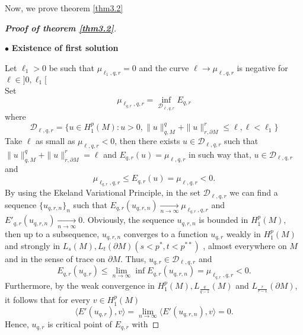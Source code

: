 \documentclass{Tran-l}
\theoremstyle{definition}
\theoremstyle{remark}
\numberwithin{equation}{section}
\begin{document}
Now, we prove theorem \ref{thm3.2}
\begin{proof}[\textbf{Proof of theorem \ref{thm3.2}}]
\begin{quote}
\end{quote}
\begin{flushleft}
$\bullet$ \textbf{Existence of first solution}
\end{flushleft}Let $\ell_1>0$ be such that $\mu_{\ell_1,q,r}=0$ and the curve
$\ell\rightarrow\mu_{\ell,q,r}$ is negative for
$\ell\in]0,\ell_1[ $ \\
Set
\begin{equation*}
\mu_{\ell_{q,r},q,r}=\inf_{{\mathcal{D}}_{\ell,q,r}}E_{q,r}
\end{equation*}
where
\begin{equation*}
{\mathcal{D}}_{\ell,q,r}=\{u\in H^p_1(M): u>0, \|u\|_{q,M}^q+\|u\|_{r,\partial
M}^r\leq\ell,\ell<\ell_1\}
\end{equation*}
Take $\ell$ as small as $\mu_{\ell,q,r}<0$, then there exists $u\in
{\mathcal{D}}_{\ell,q,r}$ such that $\|u\|_{q,M}^q+\|u\|_{r,\partial M}^r=\ell$
and $ E_{q,r}(u)=\mu_{\ell,q,r}$ in such way that,
$u\in{\mathcal{D}}_{\ell,q,r}$ and
\begin{equation}\label{eq5.2}
\mu_{\ell_{q,r},q,r}\leq E_{q,r}(u)=\mu_{\ell,q,r}<0.
\end{equation}
By using the Ekeland Variational Principle, in the set
${\mathcal{D}}_{\ell,q,r}$ we can find a sequence $\{u_{q,r,n}\}_n$ such that
$E_{q,r}(u_{q,r,n})\underset{
n\rightarrow\infty}\rightarrow\mu_{\ell_{q,r},q,r}$ and
$E'_{q,r}(u_{q,r,n})\underset{ n\rightarrow\infty}\rightarrow0$.
Obviously, the sequence $u_{q,r,n}$ is bounded in $H^p_1(M)$, then
up to a subsequence, $u_{q,r,n}$ converges to a function $u_{q,r}$
weakly in $H^p_1(M)$ and strongly in $L_s(M), L_t(\partial
M)(s<p^*,t<p^{**})$ , almost everywhere on $M$ and in the sense of
trace on $\partial M$. Thus, $u_{q,r}\in{\mathcal{D}}_{\ell,q,r}$ and
\begin{equation*}
 E_{q,r}(u_{q,r})\le\lim_{n\rightarrow\infty}\inf
E_{q,r}(u_{q,r,n})=\mu_{\ell_{q,r},q,r}<0.
\end{equation*}
Furthermore, by the weak convergence in $H^p_1(M),
L_{\frac{q}{q-1}}(M)$ and $L_{\frac{r}{r-1}}(\partial M)$, it
follows that for every $v\in H^p_1(M)$
\begin{equation*}
\langle E'(u_{q,r}),v\rangle=\lim_{n\rightarrow\infty}\langle
E'(u_{q,r,n}),v\rangle=0.
\end{equation*}
Hence, $u_{q,r}$ is critical point of $E_{q,r}$ with

\end{proof}
\end{document}
